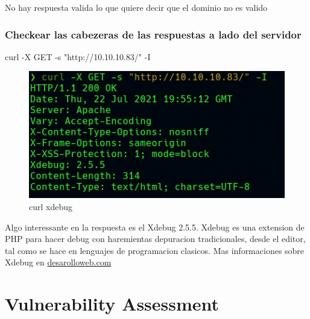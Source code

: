 \documentclass{assets/ipesethesis}
\newenvironment{Shaded}{\begin{snugshade}}{\end{snugshade}}
\newcommand{\ExtensionTok}[1]{#1}
\newcommand{\NormalTok}[1]{#1}
\newcommand{\StringTok}[1]{\textcolor[rgb]{0.31,0.60,0.02}{#1}}
\begin{document}
No hay respuesta valida lo que quiere decir que el dominio no es valido

\hypertarget{checkear-las-cabezeras-de-las-respuestas-a-lado-del-servidor}{%
\subsubsection*{Checkear las cabezeras de las respuestas a lado del servidor}\label{checkear-las-cabezeras-de-las-respuestas-a-lado-del-servidor}}

\begin{Shaded}
\begin{Highlighting}[]
\ExtensionTok{curl}\NormalTok{ -X GET -s }\StringTok{"http://10.10.10.83/"}\NormalTok{ -I}
\end{Highlighting}
\end{Shaded}

\begin{figure}
\includegraphics[width=0.9\linewidth]{images/curl-xdebug} \caption{curl xdebug}\label{fig:unnamed-chunk-2}
\end{figure}

Algo interessante en la respuesta es el Xdebug 2.5.5. Xdebug es una extension de PHP para hacer debug con haremientas
depuracion tradicionales, desde el editor, tal como se hace en lenguajes de programacion clasicos. Mas informaciones sobre
Xdebug en \href{https://desarrolloweb.com/articulos/que-es-instalar-configurar-xdebug.html}{desarolloweb.com}

\hypertarget{vulnerability-assessment}{%
\section*{Vulnerability Assessment}\label{vulnerability-assessment}}
\end{document}
